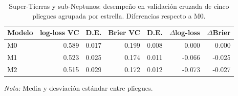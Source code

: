 \begin{table}[htbp]
    \centering
    \caption{Super-Tierras y sub-Neptunos: desempeño en validación cruzada de cinco pliegues agrupada por estrella. Diferencias respecto a M0.}
    \label{tab:Z-T5}
    \small
    \begin{tabular}{lrrrrrr}
    \toprule
    Modelo & log-loss VC & D.E. & Brier VC & D.E. & $\Delta$log-loss & $\Delta$Brier \\
    \midrule
    M0 & 0.589 & 0.017 & 0.199 & 0.008 & 0.000 & 0.000 \\
    M1 & 0.523 & 0.025 & 0.174 & 0.011 & -0.066 & -0.025 \\
    M2 & 0.515 & 0.029 & 0.172 & 0.012 & -0.073 & -0.027 \\
    \bottomrule
    \end{tabular}
    \par\smallskip
    {\footnotesize\textit{Nota:} Media y desviación estándar entre pliegues.}
\end{table}
